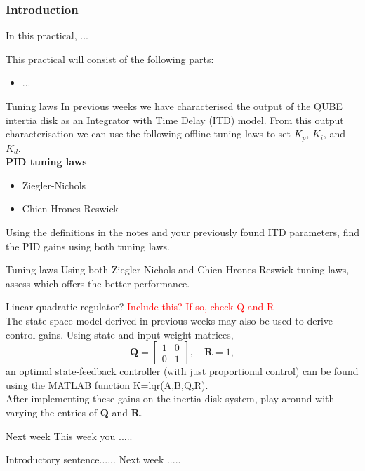 \documentclass[9pt]{beamer-control}
\begin{document}

\begin{frame}
\frametitle{Introduction}
In this practical, ...

\vfill

This practical will consist of the following parts:
\begin{itemize}
\item ...
\end{itemize}
\end{frame}


\begin{frame}{Tuning laws}
In previous weeks we have characterised the output of the QUBE intertia disk as an Integrator with Time Delay (ITD) model. From this output characterisation we can use the following offline tuning laws to set $K_p$, $K_i$, and $K_d$.\\
\textbf{PID tuning laws}
\begin{itemize}
\item Ziegler-Nichols
\item Chien-Hrones-Reswick
\end{itemize}
Using the definitions in the notes and your previously found ITD parameters, find the PID gains using both tuning laws.
\end{frame}

\begin{frame}{Tuning laws}
Using both Ziegler-Nichols and Chien-Hrones-Reswick tuning laws, assess which offers the better performance.
\end{frame}


\begin{frame}{Linear quadratic regulator?}
\textcolor{red}{Include this? If so, check Q and R}\\
The state-space model derived in previous weeks may also be used to derive control gains. Using state and input weight matrices, 
\[ \mathbf{Q} = \begin{bmatrix}
	1 & 0 \\ 0 & 1
\end{bmatrix}, \quad \mathbf{R} = 1 ,\]
an optimal state-feedback controller (with just proportional control) can be found using the MATLAB function K=lqr(A,B,Q,R).\\
After implementing these gains on the inertia disk system, play around with varying the entries of $\mathbf{Q}$ and $\mathbf{R}$.

\end{frame}

\begin{frame}{Next week}
	This week you .....
	
	Introductory sentence...... Next week ..... 
\end{frame}
\end{document}
